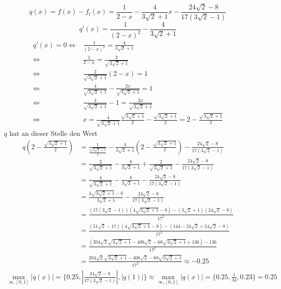 \documentclass[10pt,a4paper]{article}
\begin{document}
\begin{equation}
  q(x) = f(x) - f_{t}(x) = \frac{1}{2 - x} - \frac{4}{3\sqrt{2} + 1}x - \frac{24 \sqrt{2} - 8}{17 (3 \sqrt{2} - 1)}
\end{equation}
\begin{equation}
  q'(x) = \frac{1}{(2 - x)^{2}} - \frac{4}{3\sqrt{2} + 1}
\end{equation}
\begin{align*}
  q'(x) = 0 \Leftrightarrow & \frac{1}{(2 - x)^{2}} = \frac{4}{3\sqrt{2} + 1}\\
  \Leftrightarrow & \frac{1}{2 - x} = \frac{2}{\sqrt{3\sqrt{2} + 1}}\\
  \Leftrightarrow & \frac{2}{\sqrt{3\sqrt{2} + 1}}(2 - x) = 1\\
  \Leftrightarrow & \frac{4}{\sqrt{3\sqrt{2} + 1}} - \frac{2x}{\sqrt{3\sqrt{2} + 1}} = 1\\
  \Leftrightarrow & \frac{4}{\sqrt{3\sqrt{2} + 1}} - 1 = \frac{2x}{\sqrt{3\sqrt{2} + 1}}\\
  \Leftrightarrow & x = \frac{4}{\sqrt{3\sqrt{2} + 1}}\frac{\sqrt{3\sqrt{2} + 1}}{2} - \frac{\sqrt{3\sqrt{2} + 1}}{2} = 2 - \frac{\sqrt{3\sqrt{2} + 1}}{2}
\end{align*}
$q$ hat an dieser Stelle den Wert
\begin{align*}
  q(2 - \frac{\sqrt{3\sqrt{2} + 1}}{2}) & = \frac{1}{\frac{\sqrt{3\sqrt{2} + 1}}{2}} - \frac{4}{3\sqrt{2} + 1}(2 - \frac{\sqrt{3\sqrt{2} + 1}}{2}) - \frac{24 \sqrt{2} - 8}{17 (3 \sqrt{2} - 1)}\\
  & = \frac{2}{\sqrt{3\sqrt{2} + 1}} - \frac{8}{3\sqrt{2} + 1} + \frac{2}{\sqrt{3\sqrt{2} + 1}} - \frac{24 \sqrt{2} - 8}{17 (3 \sqrt{2} - 1)}\\
  & = \frac{4}{\sqrt{3\sqrt{2} + 1}} - \frac{8}{3\sqrt{2} + 1} - \frac{24 \sqrt{2} - 8}{17 (3 \sqrt{2} - 1)}\\
  & = \frac{4 \sqrt{3\sqrt{2} + 1} - 8}{3\sqrt{2} + 1} - \frac{24 \sqrt{2} - 8}{17 (3 \sqrt{2} - 1)}\\
  & = \frac{(17 (3 \sqrt{2} - 1))(4 \sqrt{3\sqrt{2} + 1} - 8) - (3\sqrt{2} + 1)(24 \sqrt{2} - 8)}{17^{2}}\\
  & = \frac{(51 \sqrt{2} - 17)(4 \sqrt{3\sqrt{2} + 1} - 8) - (144 - 24\sqrt{2} + 24 \sqrt{2} - 8)}{17^{2}}\\
  & = \frac{(204\sqrt{2}\sqrt{3\sqrt{2} + 1} - 408\sqrt{2} - 68\sqrt{3\sqrt{2} + 1} + 136) - 136}{17^{2}}\\
  & = \frac{204\sqrt{2}\sqrt{3\sqrt{2} + 1} - 408\sqrt{2} - 68\sqrt{3\sqrt{2} + 1}}{17^{2}} \approx -0.25
\end{align*}
\begin{align*}
  \max_{\infty, [0, 1]} |q(x)| = \{ 0.25, |\frac{24 \sqrt{2} - 8}{17 (3 \sqrt{2} - 1)}|, |q(1)| \} \approx \max_{\infty, [0, 1]} |q(x)| = \{ 0.25, \frac{1}{34}, 0.23 \} = 0.25
\end{align*}
\end{document}
